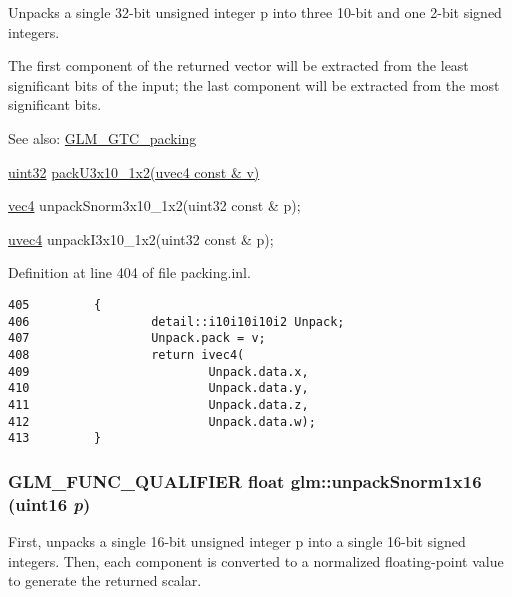 Unpacks a single 32-bit unsigned integer p into three 10-bit and one 2-bit signed integers.

The first component of the returned vector will be extracted from the least significant bits of the input; the last component will be extracted from the most significant bits.

\begin{Desc}
\item[See also:]\hyperlink{group__gtc__packing}{GLM\_\-GTC\_\-packing} 

\hyperlink{group__gtc__type__precision_g202b6a53c105fcb7e531f9b443518451}{uint32} \hyperlink{group__gtc__packing_gf656d8862628f96b20de7a36eaa1fe56}{packU3x10\_\-1x2(uvec4 const \& v)} 

\hyperlink{group__core__types_g5881b1b022d7fd1b7218f5916532dd02}{vec4} unpackSnorm3x10\_\-1x2(uint32 const \& p); 

\hyperlink{group__core__types_g1c426d19627b32b14f0089f7f4ba7b1d}{uvec4} unpackI3x10\_\-1x2(uint32 const \& p); \end{Desc}


Definition at line 404 of file packing.inl.

\begin{Code}\begin{verbatim}405         {
406                 detail::i10i10i10i2 Unpack;
407                 Unpack.pack = v;
408                 return ivec4(
409                         Unpack.data.x,
410                         Unpack.data.y,
411                         Unpack.data.z,
412                         Unpack.data.w);
413         }
\end{verbatim}
\end{Code}


\hypertarget{group__gtc__packing_g246f451cebf590726324f7a283e3d65e}{
\subsubsection[unpackSnorm1x16]{\setlength{\rightskip}{0pt plus 5cm}GLM\_\-FUNC\_\-QUALIFIER float glm::unpackSnorm1x16 (uint16 {\em p})}}
\label{group__gtc__packing_g246f451cebf590726324f7a283e3d65e}


First, unpacks a single 16-bit unsigned integer p into a single 16-bit signed integers. Then, each component is converted to a normalized floating-point value to generate the returned scalar.

